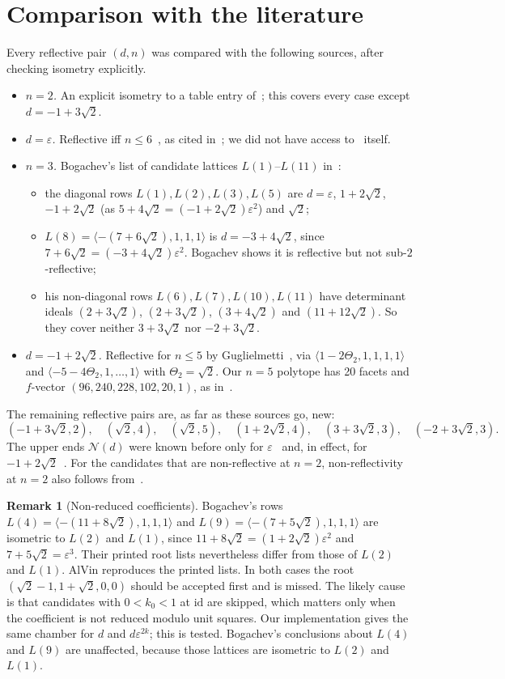 \documentclass[11pt]{amsart}
\theoremstyle{definition}
\newtheorem{remark}[theorem]{Remark}
\newcommand{\eps}{\varepsilon}
\newcommand{\id}{\mathrm{id}}
\newcommand{\Nmax}{\mathcal{N}}
\begin{document}
\section{Comparison with the literature}\label{sec:literature}
Every reflective pair $(d,n)$ was compared with the following sources, after checking
isometry explicitly.
\begin{itemize}
\item \emph{$n=2$.} An explicit isometry to a table entry of~\cite{Mar18}; this covers every
  case except $d=-1+3\sqrt2$.
\item \emph{$d=\eps$.} Reflective iff $n\le6$~\cite{Bug90}, as cited
  in~\cite{Gug17,Bel16}; we did not have access to~\cite{Bug90} itself.
\item \emph{$n=3$.} Bogachev's list of candidate lattices $L(1)$--$L(11)$ in~\cite{Bog20}:
  \begin{itemize}
  \item the diagonal rows $L(1),L(2),L(3),L(5)$ are $d=\eps$, $1+2\sqrt2$, $-1+2\sqrt2$
    (as $5+4\sqrt2=(-1+2\sqrt2)\eps^2$) and $\sqrt2$;
  \item $L(8)=\langle-(7+6\sqrt2),1,1,1\rangle$ is $d=-3+4\sqrt2$, since
    $7+6\sqrt2=(-3+4\sqrt2)\eps^2$. Bogachev shows it is reflective but not
    sub-$2$-reflective;
  \item his non-diagonal rows $L(6),L(7),L(10),L(11)$ have determinant ideals $(2+3\sqrt2)$,
    $(2+3\sqrt2)$, $(3+4\sqrt2)$ and $(11+12\sqrt2)$. So they cover neither $3+3\sqrt2$ nor
    $-2+3\sqrt2$.
  \end{itemize}
\item \emph{$d=-1+2\sqrt2$.} Reflective for $n\le5$ by Guglielmetti~\cite{Gug17}, via
  $\langle1-2\Theta_2,1,1,1,1\rangle$ and $\langle-5-4\Theta_2,1,\dots,1\rangle$ with
  $\Theta_2=\sqrt2$. Our $n=5$ polytope has 20 facets and $f$-vector
  $(96,240,228,102,20,1)$, as in~\cite{Gug17}.
\end{itemize}
The remaining reflective pairs are, as far as these sources go, new:
\[
 (-1+3\sqrt2,2),\quad(\sqrt2,4),\quad(\sqrt2,5),\quad(1+2\sqrt2,4),\quad(3+3\sqrt2,3),\quad(-2+3\sqrt2,3).
\]
The upper ends $\Nmax(d)$ were known before only for $\eps$~\cite{Bug90} and, in effect, for
$-1+2\sqrt2$~\cite{Gug17}. For the candidates that are non-reflective at $n=2$,
non-reflectivity at $n=2$ also follows from~\cite{Mar18}.

\begin{remark}[Non-reduced coefficients]\label{rem:alvin}
Bogachev's rows $L(4)=\langle-(11+8\sqrt2),1,1,1\rangle$ and $L(9)=\langle-(7+5\sqrt2),1,1,1\rangle$
are isometric to $L(2)$ and $L(1)$, since $11+8\sqrt2=(1+2\sqrt2)\eps^2$ and
$7+5\sqrt2=\eps^3$. Their printed root lists nevertheless differ from those of $L(2)$ and
$L(1)$. AlVin reproduces the printed lists. In both cases the root $(\sqrt2-1,1+\sqrt2,0,0)$
should be accepted first and is missed. The likely cause is that candidates with
$0<k_0<1$ at $\id$ are skipped, which matters only when the coefficient is not reduced modulo
unit squares. Our implementation gives the same chamber for $d$ and $d\eps^{2k}$; this is
tested. Bogachev's conclusions about $L(4)$ and $L(9)$ are unaffected, because those lattices
are isometric to $L(2)$ and $L(1)$.
\end{remark}
\end{document}
